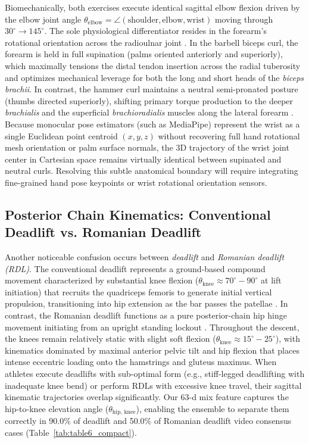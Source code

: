 \documentclass[preprint,12pt]{elsarticle}
\begin{document}
Biomechanically, both exercises execute identical sagittal elbow flexion driven by the elbow joint angle $\theta_{\text{elbow}} = \angle(\text{shoulder}, \text{elbow}, \text{wrist})$ moving through $30^\circ \to 145^\circ$. The sole physiological differentiator resides in the forearm's rotational orientation across the radioulnar joint \cite{oliveira2009,marcolin2018}. In the barbell biceps curl, the forearm is held in full supination (palms oriented anteriorly and superiorly), which maximally tensions the distal tendon insertion across the radial tuberosity and optimizes mechanical leverage for both the long and short heads of the \textit{biceps brachii}. In contrast, the hammer curl maintains a neutral semi-pronated posture (thumbs directed superiorly), shifting primary torque production to the deeper \textit{brachialis} and the superficial \textit{brachioradialis} muscles along the lateral forearm \cite{oliveira2009,marcolin2018}. Because monocular pose estimators (such as MediaPipe) represent the wrist as a single Euclidean point centroid $(x, y, z)$ without recovering full hand rotational mesh orientation or palm surface normals, the 3D trajectory of the wrist joint center in Cartesian space remains virtually identical between supinated and neutral curls. Resolving this subtle anatomical boundary will require integrating fine-grained hand pose keypoints or wrist rotational orientation sensors.

\subsection{Posterior Chain Kinematics: Conventional Deadlift vs. Romanian Deadlift}
Another noticeable confusion occurs between \textit{deadlift} and \textit{Romanian deadlift (RDL)}. The conventional deadlift represents a ground-based compound movement characterized by substantial knee flexion ($\theta_{\text{knee}} \approx 70^\circ-90^\circ$ at lift initiation) that recruits the quadriceps femoris to generate initial vertical propulsion, transitioning into hip extension as the bar passes the patellae \cite{escamilla2000}. In contrast, the Romanian deadlift functions as a pure posterior-chain hip hinge movement initiating from an upright standing lockout \cite{mcallister2014,schoenfeld2010}. Throughout the descent, the knees remain relatively static with slight soft flexion ($\theta_{\text{knee}} \approx 15^\circ-25^\circ$), with kinematics dominated by maximal anterior pelvic tilt and hip flexion that places intense eccentric loading onto the hamstrings and gluteus maximus. When athletes execute deadlifts with sub-optimal form (e.g., stiff-legged deadlifting with inadequate knee bend) or perform RDLs with excessive knee travel, their sagittal kinematic trajectories overlap significantly. Our 63-d mix feature captures the hip-to-knee elevation angle ($\theta_{\text{hip, knee}}$), enabling the ensemble to separate them correctly in 90.0\% of deadlift and 50.0\% of Romanian deadlift video consensus cases (Table~\ref{tab:table6_compact}).
\end{document}
